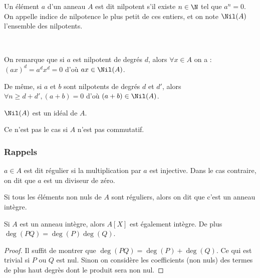 \begin{defi}[Nilpotence]
 
Un élément $a$ d'un anneau $A$ est dit nilpotent s'il existe $n\in\N$ tel que
$a^n=0$. On appelle indice de nilpotence le plus petit de ces entiers, et on
note $\Nil(A)$ l'ensemble des nilpotents.
\end{defi}

\begin{example}[Remarque]\ 

On remarque que si $a$ est nilpotent de degrés $d$, alors $\forall x\in A$ on a
: $(ax)^d = a^dx^d = 0$ d'où $ax \in \Nil(A)$.

De même, si $a$ et $b$ sont nilpotents de degrés $d$ et $d'$, alors $\forall
n\geq d+d', (a+b)=0$ d'où $(a+b) \in \Nil(A)$.
\end{example}

\begin{prop}
 
$\Nil(A)$ est un idéal de $A$.
\end{prop}

\begin{example}[Remarque] Ce n'est pas le cas si $A$ n'est pas commutatif.
\end{example}

\subsubsection{Rappels}
\vspace{0.5em}

\begin{defi}
 
 
$a\in A$ est dit régulier si la multiplication par $a$ est injective. Dans le
cas contraire, on dit que $a$ est un diviseur de zéro.

Si tous les éléments non nuls de $A$ sont réguliers, alors on dit que c'est un
anneau intègre.
\end{defi}

\begin{prop}
 
Si $A$ est un anneau intègre, alors $A[X]$ est également intègre. De plus
$\deg(PQ) = \deg(P) \deg(Q)$.
\end{prop}

\begin{proof} Il suffit de montrer que $\deg(PQ) = \deg(P) + \deg(Q)$. Ce qui
est trivial si $P$ ou $Q$ est nul. Sinon on considère les coefficients (non
nuls) des termes de plus haut degrès dont le produit sera non nul.
\end{proof}


